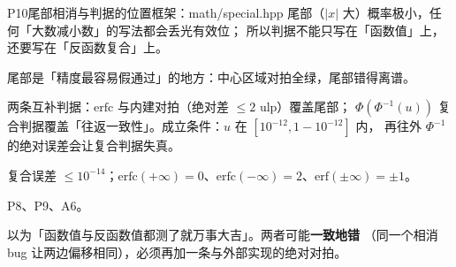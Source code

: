 \begin{know}{P10}{尾部相消与判据的位置}{框架：math/special.hpp}
 尾部（$|x|$ 大）概率极小，任何「大数减小数」的写法都会丢光有效位；
所以判据不能只写在「函数值」上，还要写在「反函数复合」上。

 尾部是「精度最容易假通过」的地方：中心区域对拍全绿，尾部错得离谱。

 两条互补判据：$\mathrm{erfc}$ 与内建对拍（绝对差 $\le2$ ulp）覆盖尾部；
$\Phi(\Phi^{-1}(u))$ 复合判据覆盖「往返一致性」。成立条件：$u$ 在 $[10^{-12},1-10^{-12}]$ 内，
再往外 $\Phi^{-1}$ 的绝对误差会让复合判据失真。

 复合误差 $\le10^{-14}$；$\mathrm{erfc}(+\infty)=0$、$\mathrm{erfc}(-\infty)=2$、$\mathrm{erf}(\pm\infty)=\pm1$。

 P8、P9、A6。

 以为「函数值与反函数值都测了就万事大吉」。两者可能\textbf{一致地错}
（同一个相消 bug 让两边偏移相同），必须再加一条与外部实现的绝对对拍。
\end{know}
